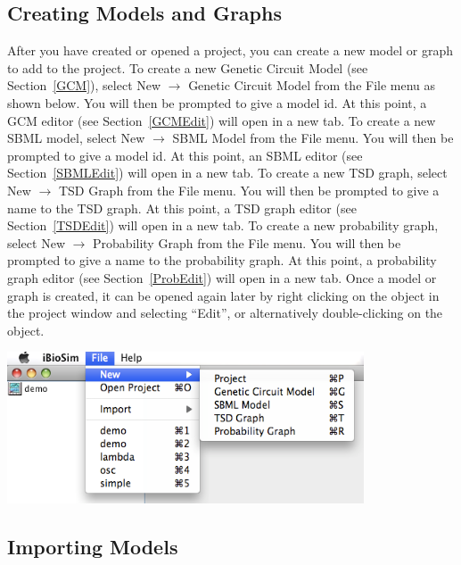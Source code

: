\documentclass[titlepage,11pt]{article}
\begin{document}
\subsection{Creating Models and Graphs}

\noindent
After you have created or opened a project, you can create a
new model or graph to add to the project.  To create a new 
Genetic Circuit Model (see Section~\ref{GCM}), select 
New $\rightarrow$ Genetic Circuit Model from the
File menu as shown below. You will then be prompted to give a model id. At this
point, a GCM editor (see Section~\ref{GCMEdit}) will open in a new
tab. To create a new SBML model, select New $\rightarrow$ SBML Model
from the File menu. You will then be prompted to give a model id.
At this point, an SBML editor (see Section~\ref{SBMLEdit}) will open
in a new tab. To create a new TSD graph, select New $\rightarrow$ TSD Graph
from the File menu. You will then be prompted to give a name to
the TSD graph.  At this point, a TSD graph editor (see Section~\ref{TSDEdit})
will open in a new tab. To create a new probability graph, select 
New $\rightarrow$ Probability Graph from the File menu. You will then
be prompted to give a name to the probability graph. At this point, a 
probability graph editor (see Section~\ref{ProbEdit})
will open in a new tab. Once a model or graph is created, it can
be opened again later by right clicking on the object in the
project window and selecting ``Edit'', or alternatively
double-clicking on the object.
\begin{center}
\includegraphics[height=45mm]{screenshots/newModel}
\end{center}

\subsection{Importing Models}
\end{document}
